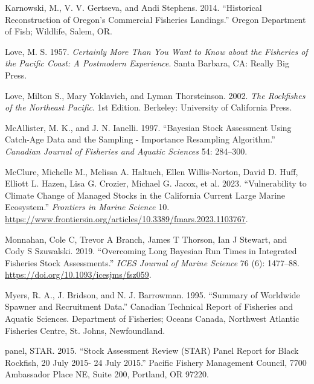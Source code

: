 \documentclass[11pt,
  english,
  letterpaper,
]{article}
\newlength{\cslhangindent}
\newenvironment{CSLReferences}[2] %
 {%
  \setlength{\parindent}{0pt}
  \ifodd #1 \everypar{\setlength{\hangindent}{\cslhangindent}}\ignorespaces\fi
  \ifnum #2 > 0
  \setlength{\parskip}{#2\baselineskip}
  \fi
 }%
 {}
\begin{document}
\begin{CSLReferences}{1}{0}
\leavevmode{}%
Karnowski, M., V. V. Gertseva, and Andi Stephens. 2014. {``Historical {Reconstruction} of {Oregon}'s {Commercial} {Fisheries} {Landings}.''} Oregon Department of Fish; Wildlife, Salem, OR.

\leavevmode{}%
Love, M. S. 1957. \emph{Certainly More Than You Want to Know about the Fisheries of the Pacific Coast: A Postmodern Experience}. Santa Barbara, CA: Really Big Press.

\leavevmode{}%
Love, Milton S., Mary Yoklavich, and Lyman Thorsteinson. 2002. \emph{The Rockfishes of the Northeast Pacific}. 1st Edition. Berkeley: University of California Press.

\leavevmode{}%
McAllister, M. K., and J. N. Ianelli. 1997. {``Bayesian Stock Assessment Using Catch-Age Data and the Sampling - Importance Resampling Algorithm.''} \emph{Canadian Journal of Fisheries and Aquatic Sciences} 54: 284--300.

\leavevmode{}%
McClure, Michelle M., Melissa A. Haltuch, Ellen Willis-Norton, David D. Huff, Elliott L. Hazen, Lisa G. Crozier, Michael G. Jacox, et al. 2023. {``Vulnerability to Climate Change of Managed Stocks in the California Current Large Marine Ecosystem.''} \emph{Frontiers in Marine Science} 10. \url{https://www.frontiersin.org/articles/10.3389/fmars.2023.1103767}.

\leavevmode{}%
Monnahan, Cole C, Trevor A Branch, James T Thorson, Ian J Stewart, and Cody S Szuwalski. 2019. {``Overcoming Long Bayesian Run Times in Integrated Fisheries Stock Assessments.''} \emph{{ICES} Journal of Marine Science} 76 (6): 1477--88. \url{https://doi.org/10.1093/icesjms/fsz059}.

\leavevmode{}%
Myers, R. A., J. Bridson, and N. J. Barrowman. 1995. {``Summary of Worldwide Spawner and Recruitment Data.''} Canadian Technical Report of Fisheries and Aquatic Sciences. Department of Fisheries; Oceans Canada, Northwest Atlantic Fisheries Centre, St. Johns, Newfoundland.

\leavevmode{}%
panel, STAR. 2015. {``Stock Assessment Review (STAR) Panel Report for Black Rockfish, 20 July 2015- 24 July 2015.''} Pacific Fishery Management Council, 7700 Ambassador Place NE, Suite 200, Portland, OR 97220.


\end{CSLReferences}
\end{document}
